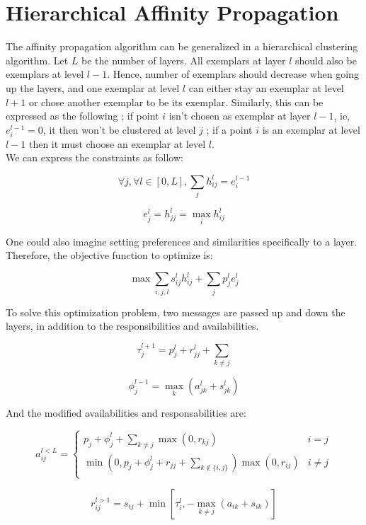 \documentclass{ipol}
\begin{document}
\section{Hierarchical Affinity Propagation}

The affinity propagation algorithm can be generalized in a hierarchical
clustering algorithm. Let $L$ be the number of layers. All exemplars at layer
$l$ should also be exemplars at level $l -1$. Hence, number of exemplars
should decrease when going up the layers, and one exemplar at level $l$ can
either stay an exemplar at level $l + 1$ or chose another exemplar to be its
exemplar. Similarly, this can be expressed as the following ; if point $i$ isn't chosen as
exemplar at layer $l - 1$, ie, $e_{i}^{l - 1} = 0$, it then won't be clustered at
level $j$ ; if a point $i$ is an exemplar at level $l -1$ then it must choose
an exemplar at level $l$.\\
We can express the constraints as follow:

\begin{equation}
\forall j, \forall l \in [0, L], \sum_{j} h_{ij}^l = e_i^{l-1}
\end{equation}

\begin{equation}
e_j^l = h_{jj}^l = \max_i h_{ij}^l
\end{equation}

One could also imagine setting preferences and similarities specifically to a
layer. Therefore, the objective function to optimize is:

\begin{equation}
\max \sum_{i, j, l} s^l_{ij} h^l_{ij} + \sum_{j} p^l_j e^l_j
\end{equation}

To solve this optimization problem, two messages are passed up and down the
layers, in addition to the responsibilities and availabilities.

\begin{equation}
\tau_j^{l + 1} = p^l_j + r_{jj}^l + \sum_{k \neq j}
\end{equation}

\begin{equation}
\phi_j^{l - 1} = \max_k (a_{jk}^l + s_{jk}^l)
\end{equation}

And the modified availabilities and responsabilities are:

\begin{equation}
a_{ij}^{l < L} = \begin{cases}
	    p_j + \phi_j^l + \sum_{k \neq j} \max(0, r_{kj}) &  i = j \\
	    \min ( 0, p_j + \phi_j^l + r_{jj} + \sum_{k \notin \{i, j\} } ) \max (0, r_{ij}) & i \neq j\\
	 \end{cases}
\end{equation}

\begin{equation*}
r_{ij}^{l > 1} = s_{ij}  + \min [ \tau_i^l, - \max_{k \neq j} (a_{ik} + s_{ik}) ]
\end{equation*}



\end{document}
